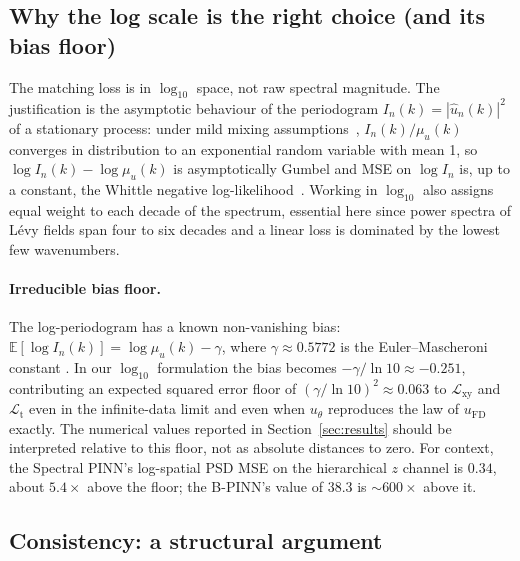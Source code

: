 \documentclass[review,12pt]{elsarticle}
\begin{document}
\subsection{Why the log scale is the right choice (and its bias floor)}

The matching loss is in \(\log_{10}\) space, not raw spectral
magnitude. The justification is the asymptotic behaviour of the
periodogram \(I_n(k) = |\widehat u_n(k)|^2\) of a stationary
process: under mild mixing
assumptions~\cite{Brillinger1981,Dahlhaus1996},
\(I_n(k) / \mu_u(k)\) converges in distribution to an exponential
random variable with mean 1, so \(\log I_n(k) - \log \mu_u(k)\)
is asymptotically Gumbel and MSE on \(\log I_n\) is, up to a
constant, the Whittle negative
log-likelihood~\cite{Whittle1953}. Working in \(\log_{10}\) also
assigns equal weight to each decade of the spectrum, essential
here since power spectra of L\'evy fields span four to six
decades and a linear loss is dominated by the lowest few
wavenumbers.

\paragraph{Irreducible bias floor.}
The log-periodogram has a known non-vanishing bias:
\(\mathbb E[\log I_n(k)] = \log \mu_u(k) - \gamma\),
where \(\gamma \approx 0.5772\) is the Euler--Mascheroni constant
\cite{Brillinger1981}. In our \(\log_{10}\) formulation the bias
becomes \(-\gamma/\ln 10 \approx -0.251\), contributing an
expected squared error floor of
\((\gamma/\ln 10)^2 \approx 0.063\) to
\(\mathcal L_{\mathrm{xy}}\) and \(\mathcal L_{\mathrm{t}}\) even
in the infinite-data limit and even when \(u_\theta\) reproduces
the law of \(u_{\mathrm{FD}}\) exactly. The numerical values
reported in Section~\ref{sec:results} should be interpreted
relative to this floor, not as absolute distances to zero. For
context, the Spectral PINN's log-spatial PSD MSE on the
hierarchical \(z\) channel is \(0.34\), about \(5.4\times\) above
the floor; the B-PINN's value of \(38.3\) is \(\sim 600\times\)
above it.

\subsection{Consistency: a structural argument}
\end{document}
